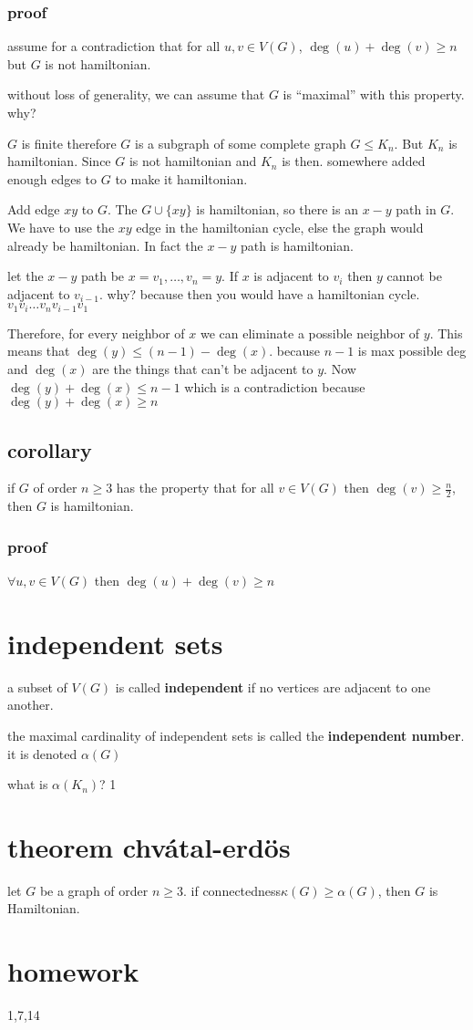 \documentclass[letterpaper]{article}
\begin{document}
\subsubsection*{proof}
assume for a contradiction that for all $u,v\in V(G)$, $\deg(u)+\deg(v)\ge n$ but $G$ is not hamiltonian.

without loss of generality, we can assume that $G$ is ``maximal'' with this property. why?

$G$ is finite therefore $G$ is a subgraph  of some complete graph $G\le K_n$. But $K_n$ is hamiltonian. Since $G$ is not hamiltonian and $K_n$ is then. somewhere added enough edges to $G$ to make it hamiltonian.

Add edge $xy$ to $G$. The $G\cup \{xy\}$ is hamiltonian, so there is an $x-y$ path in $G$. We have to use the $xy$ edge in the hamiltonian cycle, else the graph would already be hamiltonian. In fact the $x-y$ path is hamiltonian.

let the $x-y$ path be $x=v_1,\dots,v_n=y$. If $x$ is adjacent to $v_i$ then $y$ cannot be adjacent to $v_{i-1}$. why? because then you would have a hamiltonian cycle. $v_1v_i\dots v_nv_{i-1}v_1$

Therefore, for every neighbor of $x$ we can eliminate a possible neighbor of $y$. This means that $\deg(y)\le(n-1)-\deg(x)$. because $n-1$ is max possible deg and $\deg(x)$ are the things that can't be adjacent to $y$. Now $\deg(y)+\deg(x)\le n-1$ which is a contradiction because $\deg(y)+\deg(x)\ge n$

\subsection*{corollary}
if $G$ of order $n\ge 3$ has the property that for all $v\in V(G)$ then $\deg(v)\ge \frac{n}{2}$, then $G$ is hamiltonian.
\subsubsection*{proof}
$\forall u,v\in V(G)$ then $\deg(u)+\deg(v)\ge n$

\section*{independent sets}
a subset of $V(G)$ is called {\bfseries independent} if no vertices are adjacent to one another.

the maximal cardinality of independent sets is called the {\bfseries independent number}. it is denoted $\alpha(G)$

what is $\alpha(K_n)$? 1


\section*{theorem chvátal-erdös}
let $G$ be a graph of order $n\ge 3$. if connectedness$\kappa(G)\ge \alpha(G)$, then $G$ is Hamiltonian.

\section*{homework}
1,7,14
\end{document}
